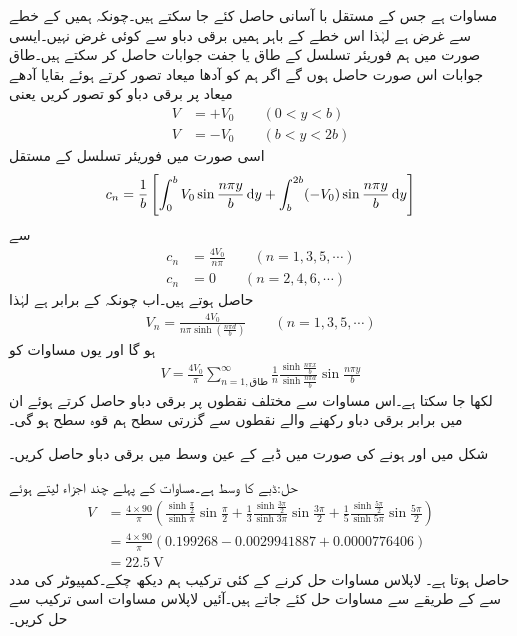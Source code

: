 مساوات   ہے جس کے مستقل با آسانی حاصل کئے جا سکتے ہیں۔چونکہ ہمیں  کے خطے سے غرض ہے لہٰذا اس خطے کے باہر ہمیں برقی دباو سے کوئی غرض نہیں۔ایسی صورت میں ہم فوریئر تسلسل کے طاق یا جفت جوابات حاصل کر سکتے ہیں۔طاق جوابات اس صورت حاصل ہوں گے اگر ہم  کو آدھا میعاد تصور کرتے ہوئے بقایا آدھے میعاد  پر برقی دباو کو  تصور کریں یعنی  
\begin{align*}
V&=+V_0 \quad \quad (0<y<b)\\
V&=-V_0 \quad \quad (b<y<2b)
\end{align*}
اسی صورت میں فوریئر تسلسل کے مستقل
\begin{align*}
c_n=\frac{1}{b}\left[\int_{0}^{b} V_0 \sin \frac{n\pi y}{b} \dif y +\int_{b}^{2b} (-V_0) \sin \frac{n\pi y}{b} \dif y \right]
\end{align*}
سے
\begin{align*}
c_n&=\frac{4V_0}{n\pi} \quad \quad (n=1,3,5,\cdots)\\
c_n&=0 \quad \quad (n=2,4,6,\cdots)
\end{align*}
حاصل ہوتے ہیں۔اب چونکہ  کے برابر ہے لہٰذا
\begin{align*}
V_n=\frac{4V_0}{n \pi \sinh (\tfrac{n \pi d}{b})}  \quad \quad (n=1,3,5,\cdots)
\end{align*}
ہو گا اور یوں مساوات  کو
\begin{align}\label{مساوات_لاپلاس_طاقتی_تسلسل_مساوات}
V=\frac{4V_0}{\pi} \sum_{n=1,\textrm{طاق}}^{\infty} \frac{1}{n} \frac{\sinh \frac{n\pi x}{b}}{\sinh \tfrac{n\pi d}{b}} \sin \frac{n\pi y}{b}
\end{align}
لکھا جا سکتا ہے۔اس مساوات سے مختلف نقطوں پر برقی دباو  حاصل کرتے ہوئے  ان میں برابر برقی دباو رکھنے والے نقطوں سے گزرتی سطح ہم قوہ سطح ہو گی۔

شکل  میں  اور  ہونے کی صورت میں ڈبے کے عین وسط میں برقی دباو حاصل کریں۔

حل:ڈبے کا وسط  ہے۔مساوات  کے پہلے چند اجزاء لیتے ہوئے
\begin{align*}
V&=\frac{4\times 90}{\pi} \left( \frac{\sinh \frac{\pi}{2}}{\sinh \pi} \sin \frac{\pi}{2}+\frac{1}{3}  \frac{\sinh \frac{3\pi}{2}}{\sinh 3\pi} \sin \frac{3\pi}{2}+\frac{1}{5}  \frac{\sinh \frac{5\pi}{2}}{\sinh 5\pi} \sin \frac{5\pi}{2}\right)\\
&=\frac{4\times 90}{\pi} \left(0.199268-0.0029941887+0.0000776406 \right)\\
&=\SI{22.5}{\volt}
\end{align*}
حاصل ہوتا ہے۔
لاپلاس مساوات حل کرنے کے کئی ترکیب ہم دیکھ چکے۔کمپیوٹر کی مدد سے  کے طریقے سے مساوات حل کئے جاتے ہیں۔آئیں لاپلاس مساوات اسی ترکیب سے حل کریں۔
  
